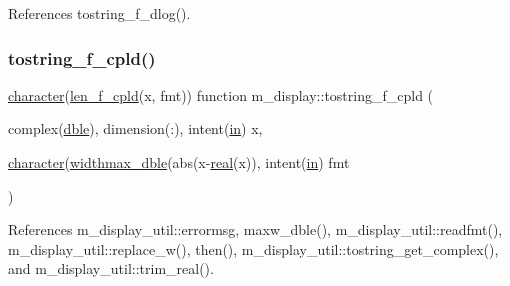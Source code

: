 References tostring\+\_\+f\+\_\+dlog().

\mbox{\label{namespacem__display_a7bab74c992649c74c27fe924c235e448}} 
\subsubsection{\texorpdfstring{tostring\+\_\+f\+\_\+cpld()}{tostring\_f\_cpld()}}
{\footnotesize\ttfamily \hyperlink{option__stopwatch_83_8txt_abd4b21fbbd175834027b5224bfe97e66}{character}(\hyperlink{namespacem__display_a803611d2a793f2a4aa7563b6c8295cb3}{len\+\_\+f\+\_\+cpld}(x, fmt)) function m\+\_\+display\+::tostring\+\_\+f\+\_\+cpld (\begin{DoxyParamCaption}\item[{complex(\hyperlink{namespacem__display_a46d90b75b6ccef7ccade133e5847e815}{dble}), dimension(\+:), intent(\hyperlink{M__journal_83_8txt_afce72651d1eed785a2132bee863b2f38}{in})}]{x,  }\item[{\hyperlink{option__stopwatch_83_8txt_abd4b21fbbd175834027b5224bfe97e66}{character}(\hyperlink{namespacem__display_aed07125464a462f9fa53ed2333846273}{widthmax\+\_\+dble}(abs(x-\/\hyperlink{read__watch_83_8txt_abdb62bde002f38ef75f810d3a905a823}{real}(x)), intent(\hyperlink{M__journal_83_8txt_afce72651d1eed785a2132bee863b2f38}{in})}]{fmt }\end{DoxyParamCaption})\hspace{0.3cm}{\ttfamily [private]}}



References m\+\_\+display\+\_\+util\+::errormsg, maxw\+\_\+dble(), m\+\_\+display\+\_\+util\+::readfmt(), m\+\_\+display\+\_\+util\+::replace\+\_\+w(), then(), m\+\_\+display\+\_\+util\+::tostring\+\_\+get\+\_\+complex(), and m\+\_\+display\+\_\+util\+::trim\+\_\+real().

\mbox{\label{namespacem__display_af19de6a6efe76fa3dc9bd86a33f9321b}} 
